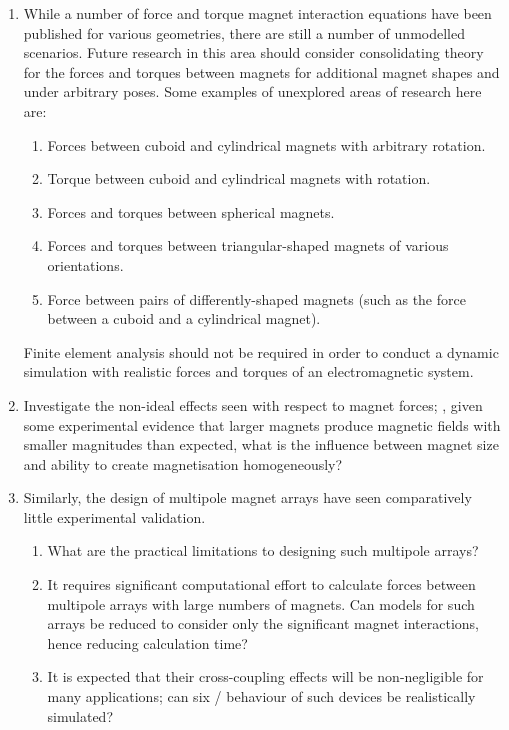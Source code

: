 \documentclass[10pt,a4paper]{memoir}
\begin{document}
\begin{enumerate}\itemsep=\medskipamount
\item
While a number of force and torque magnet interaction equations have been published for various geometries, there are still a number of unmodelled scenarios.
Future research in this area should consider consolidating theory for the forces and torques between magnets for additional magnet shapes and under arbitrary poses.
Some examples of unexplored areas of research here are:
\begin{enumerate}
\item Forces between cuboid and cylindrical magnets with arbitrary rotation.
\item Torque between cuboid and cylindrical magnets with rotation.
\item Forces and torques between spherical magnets.
\item Forces and torques between triangular-shaped magnets of various orientations.
\item Force between pairs of differently-shaped magnets (such as the force between a cuboid and a cylindrical magnet).
\end{enumerate}
Finite element analysis should not be required in order to conduct a dynamic simulation with realistic forces and torques of an electromagnetic system.

\item
Investigate the non-ideal effects seen with respect to magnet forces; \eg, given some experimental evidence that larger magnets produce magnetic fields with smaller magnitudes than expected, what is the influence between magnet size and ability to create magnetisation homogeneously?

\item
Similarly, the design of multipole magnet arrays have seen comparatively little experimental validation.
\begin{enumerate}
\item
What are the practical limitations to designing such multipole arrays?
\item
It requires significant computational effort to calculate forces between multipole arrays with large numbers of magnets. Can models for such arrays be reduced to consider only the significant magnet interactions, hence reducing calculation time?
\item
It is expected that their cross-coupling effects will be non-negligible for many applications; can six \dof/ behaviour of such devices be realistically simulated?
\end{enumerate}

\end{enumerate}
\end{document}
